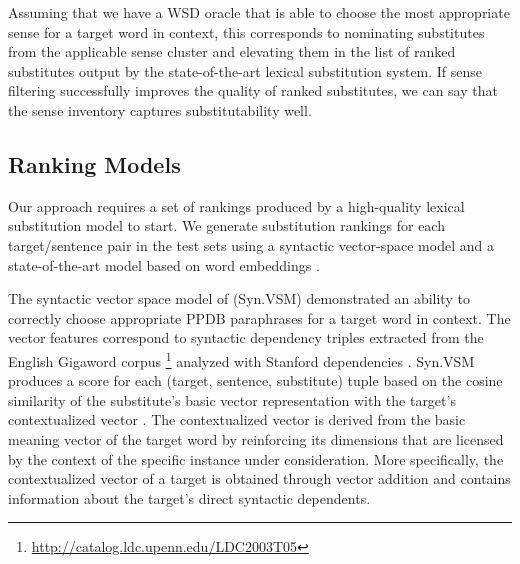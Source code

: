 \documentclass[11pt]{article}
\begin{document}
	Assuming that we have a WSD oracle that is able to choose the most appropriate sense for a target word in context, this corresponds to nominating substitutes from the applicable sense cluster and elevating them in the list of ranked substitutes output by the state-of-the-art lexical substitution system. 
	If sense filtering successfully improves the quality of ranked substitutes, we can say that the sense inventory captures substitutability well. 
%	
	
	\subsection{Ranking Models}
	
	Our approach requires a set of rankings produced by a high-quality lexical substitution model to start. We generate substitution rankings for each target/sentence pair in the test sets using a syntactic vector-space model \cite{thater-furstenau-pinkal:2011:IJCNLP-2011,apidianaki:2016:EMNLP2016} and a state-of-the-art model based on word embeddings \cite{melamud-levy-dagan:2015:VSM-NLP}. 
	
	The syntactic vector space model of  (Syn.VSM) demonstrated an ability to correctly choose appropriate PPDB paraphrases for a target word in context. The vector features correspond to syntactic dependency triples extracted from the English Gigaword corpus \footnote{\url{http://catalog.ldc.upenn.edu/LDC2003T05}} analyzed with Stanford dependencies \cite{mcdm:06}. Syn.VSM produces a score for each (target, sentence, substitute) tuple based on the cosine similarity of the substitute's basic vector representation with the target's contextualized vector \cite{thater-furstenau-pinkal:2011:IJCNLP-2011}. The contextualized vector is derived from the basic meaning vector of the target word by reinforcing its dimensions that are licensed by the context of the specific instance under consideration. More specifically, the contextualized vector of a target is obtained through vector addition and contains information about the target's direct syntactic dependents. 
	
\end{document}
